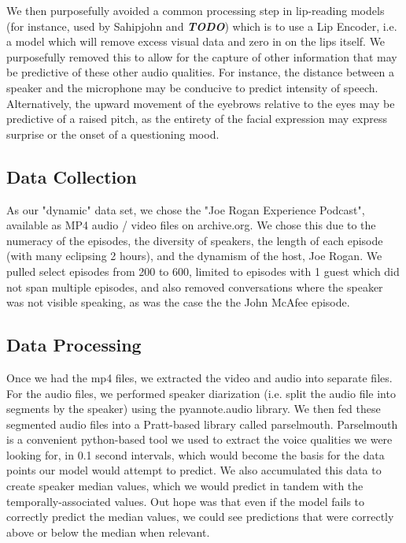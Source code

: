 \documentclass[10pt,twocolumn,letterpaper]{article}
\begin{document}
We then purposefully avoided a common processing step in lip-reading models (for instance, used by Sahipjohn \etal \cite{RobustL2S} and \textbf{\textit{TODO}})  which is to use a Lip Encoder, i.e. a model which will remove excess visual data and zero in on the lips itself. We purposefully removed this to allow for the capture of other information that may be predictive of these other audio qualities. For instance, the distance between a speaker and the microphone may be conducive to predict intensity of speech. Alternatively, the upward movement of the eyebrows relative to the eyes may be predictive of a raised pitch, as the entirety of the facial expression may express surprise or the onset of a questioning mood.   

\subsection{Data Collection}

As our "dynamic" data set, we chose the "Joe Rogan Experience Podcast", available as MP4 audio / video files on archive.org. We chose this due to the numeracy of the episodes, the diversity of speakers, the length of each episode (with many eclipsing 2 hours), and the dynamism of the host, Joe Rogan. We pulled select episodes from 200 to 600, limited to episodes with 1 guest which did not span multiple episodes, and also removed conversations where the speaker was not visible speaking, as was the case the the John McAfee episode.

\subsection{Data Processing}

Once we had the mp4 files, we extracted the video and audio into separate files. For the audio files, we performed speaker diarization (i.e. split the audio file into segments by the speaker) using the pyannote.audio library\cite{Bredin23}. We then fed these segmented audio files into a Pratt\cite{Pratt}-based library called parselmouth\cite{Parselmouth}.  Parselmouth is a convenient python-based tool we used to extract the voice qualities we were looking for, in 0.1 second intervals, which would become the basis for the data points our model would attempt to predict. We also accumulated this data to create speaker median values, which we would predict in tandem with the temporally-associated values. Out hope was that even if the model fails to correctly predict the median values, we could see predictions that were correctly above or below the median when relevant. 
\end{document}
